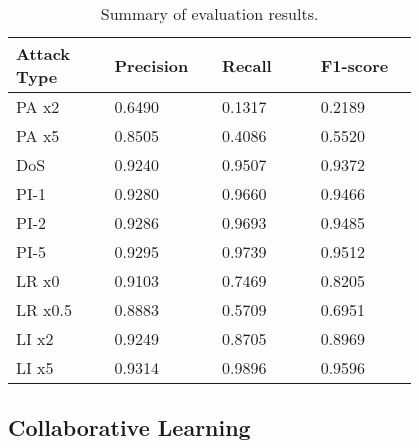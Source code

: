 






\begin{table}[htbp!] 
\centering
\caption{Summary of evaluation results.}
\begin{tabular}{| p{0.2\linewidth} | p{0.2\linewidth} | p{0.2\linewidth} | p{0.2\linewidth} |}
\hline
\textbf{Attack Type} & \textbf{Precision} & \textbf{Recall} & \textbf{F1-score}
\\ \hline
PA x2 & 0.6490 & 0.1317 & 0.2189 
\\ \hline
PA x5 &  0.8505 & 0.4086 & 0.5520 
\\ \hline
DoS &  0.9240 & 0.9507 & 0.9372 
\\ \hline
PI-1 &  0.9280 & 0.9660 & 0.9466 
\\ \hline
PI-2 &  0.9286 & 0.9693 & 0.9485 
\\ \hline
PI-5 & 0.9295 & 0.9739 & 0.9512 
\\ \hline
LR x0 &  0.9103 & 0.7469 & 0.8205 
\\ \hline
LR x0.5 &  0.8883 & 0.5709 & 0.6951 
\\ \hline
LI x2 &  0.9249 & 0.8705 & 0.8969 
\\ \hline
LI x5 &  0.9314 & 0.9896 & 0.9596 
\\ \hline
\end{tabular}
\centering
\label{tab:conclusion_evaluation}
\end{table}




\subsection{Collaborative Learning}

